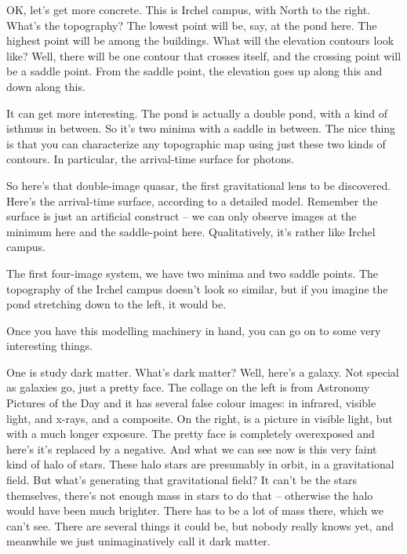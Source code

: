\next

OK, let's get more concrete.  This is Irchel campus, with North to the
right.  What's the topography?  The lowest point will be, say, at the
pond here.  The highest point will be among the buildings.  What will
the elevation contours look like?  Well, there will be one contour
that crosses itself, and the crossing point will be a saddle point.
From the saddle point, the elevation goes up along this and down along
this.

\next

It can get more interesting.  The pond is actually a double pond, with
a kind of isthmus in between.  So it's two minima with a saddle in
between.  The nice thing is that you can characterize any topographic
map using just these two kinds of contours.  In particular, the
arrival-time surface for photons.

\next

So here's that double-image quasar, the first gravitational lens to be
discovered.  Here's the arrival-time surface, according to a detailed
model.  Remember the surface is just an artificial construct -- we can
only observe images at the minimum here and the saddle-point here.
Qualitatively, it's rather like Irchel campus.

The first four-image system, we have two minima and two saddle points.
The topography of the Irchel campus doesn't look so similar, but if
you imagine the pond stretching down to the left, it would be.

Once you have this modelling machinery in hand, you can go on to some
very interesting things.

\next

One is study dark matter.  What's dark matter?  Well, here's a galaxy.
Not special as galaxies go, just a pretty face.  The collage on the
left is from Astronomy Pictures of the Day and it has several false
colour images: in infrared, visible light, and x-rays, and a
composite.  On the right, is a picture in visible light, but with a
much longer exposure.  The pretty face is completely overexposed and
here's it's replaced by a negative.  And what we can see now is this
very faint kind of halo of stars.  These halo stars are presumably in
orbit, in a gravitational field.  But what's generating that
gravitational field?  It can't be the stars themselves, there's not
enough mass in stars to do that -- otherwise the halo would have been
much brighter.  There has to be a lot of mass there, which we can't
see.  There are several things it could be, but nobody really knows
yet, and meanwhile we just unimaginatively call it dark matter.

